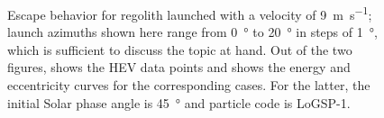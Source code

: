 \begin{figure}[htb]
\caption{Escape behavior for regolith launched with a velocity of \SI{9}{\metre\per\second}; launch azimuths shown here range from \SI{0}{\degree} to \SI{20}{\degree} in steps of \SI{1}{\degree}, which is sufficient to discuss the topic at hand. Out of the two figures, \protect{} shows the \gls{HEV} data points and \protect{} shows the energy and eccentricity curves for the corresponding cases. For the latter, the initial Solar phase angle is \SI{45}{\degree} and particle code is LoGSP-1.}
\label{fig:escape_9ms_noSP_spanalysis}
\end{figure}
\FloatBarrier


